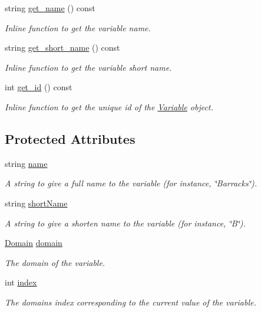 \begin{DoxyCompactItemize}
string \hyperlink{classghost_1_1Variable_a70c22841aa8d0ebe75eea92f1831c126}{get\+\_\+name} () const 
\begin{DoxyCompactList}\small\item\em Inline function to get the variable name. \end{DoxyCompactList}\item 
string \hyperlink{classghost_1_1Variable_a993e65196f2bcd0e5e5f4453736e36c5}{get\+\_\+short\+\_\+name} () const 
\begin{DoxyCompactList}\small\item\em Inline function to get the variable short name. \end{DoxyCompactList}\item 
int \hyperlink{classghost_1_1Variable_adc5da5dedaa3d47a5eb4092b08c3f77c}{get\+\_\+id} () const 
\begin{DoxyCompactList}\small\item\em Inline function to get the unique id of the \hyperlink{classghost_1_1Variable}{Variable} object. \end{DoxyCompactList}\end{DoxyCompactItemize}
\subsection*{Protected Attributes}
\begin{DoxyCompactItemize}
\item 
string \hyperlink{classghost_1_1Variable_a05cf4a4cd3a5c033028e0b0f11d1dafd}{name}
\begin{DoxyCompactList}\small\item\em A string to give a full name to the variable (for instance, \char`\"{}\+Barracks\char`\"{}). \end{DoxyCompactList}\item 
string \hyperlink{classghost_1_1Variable_afb5eb79a7f6351b4305fe082699b6d7d}{short\+Name}
\begin{DoxyCompactList}\small\item\em A string to give a shorten name to the variable (for instance, \char`\"{}\+B\char`\"{}). \end{DoxyCompactList}\item 
\hyperlink{classghost_1_1Domain}{Domain} \hyperlink{classghost_1_1Variable_ab3d7bfa2e8c2139473775a6b797d0991}{domain}
\begin{DoxyCompactList}\small\item\em The domain of the variable. \end{DoxyCompactList}\item 
int \hyperlink{classghost_1_1Variable_a934efa463fb1897b4266040e321dbc41}{index}
\begin{DoxyCompactList}\small\item\em The domain\textquotesingle{}s index corresponding to the current value of the variable. \end{DoxyCompactList}\end{DoxyCompactItemize}

